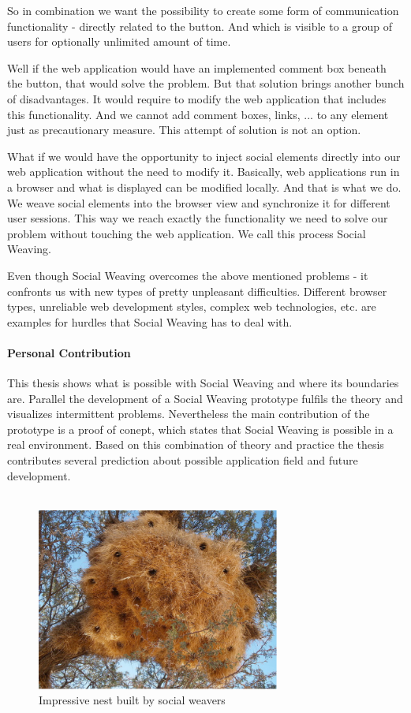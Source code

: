 So in combination we want the possibility to create some form of communication functionality - directly related to the button. And which is visible to a group of users for optionally unlimited amount of time.

Well if the web application would have an implemented comment box beneath the button, that would solve the problem. But that  solution brings another bunch of disadvantages. It would require to modify the web application that includes this functionality. And we cannot add comment boxes, links, ... to any element just as precautionary measure. This attempt of solution is not an option. 

What if we would have the opportunity to inject social elements directly into our web application without the need to modify it. Basically, web applications run in a browser and what is displayed can be modified locally. And that is what we do. We weave social elements into the browser view and synchronize it for different user sessions. This way we reach exactly the functionality we need to solve our problem without touching the web application. We call this process Social Weaving. 

Even though Social Weaving overcomes the above mentioned problems - it confronts us with new types of pretty unpleasant difficulties. Different browser types, unreliable web development styles, complex web technologies, etc. are examples for hurdles that Social Weaving has to deal with. 

\paragraph{Personal Contribution}

This thesis shows what is possible with Social Weaving and where its boundaries are. Parallel the development of a Social Weaving prototype fulfils the theory and visualizes intermittent problems. Nevertheless the main contribution of the prototype is a proof of conept, which states that Social Weaving is possible in a real environment. 
Based on this combination of theory and practice the thesis contributes several  prediction about possible application field and future development. \\ \\

\begin{figure}\centering
		\includegraphics[width=8cm]{images/sowe-nest.png}
		\caption{Impressive nest built by social weavers}
		\label{sowe-nest}
\end{figure} 


